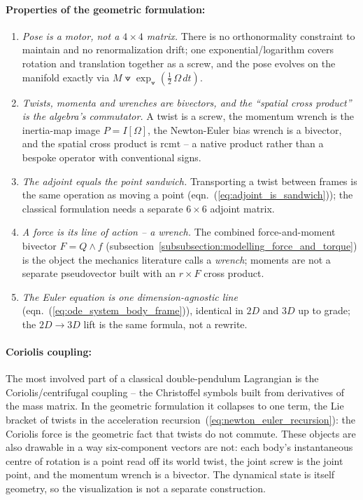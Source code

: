 \paragraph{Properties of the geometric formulation:}
\begin{enumerate}
    \item \emph{Pose is a motor, not a $4\times4$ matrix.} There is no orthonormality
          constraint to maintain and no renormalization drift; one exponential/logarithm
          covers rotation and translation together as a screw, and the pose evolves on the
          manifold exactly via $M \veedot \exp_\veedot(\tfrac12\,\Omega\,dt)$.
    \item \emph{Twists, momenta and wrenches are bivectors, and the ``spatial cross
          product'' is the algebra's commutator.} A twist is a screw, the
          momentum wrench is the inertia-map image $P = I[\Omega]$, the Newton-Euler bias
          wrench is a bivector, and the spatial cross product is $\mathrm{rcmt}$ -- a
          native product rather than a bespoke operator with conventional signs.
    \item \emph{The adjoint equals the point sandwich.} Transporting a twist between
          frames is the same operation as moving a point
          (eqn.~(\ref{eq:adjoint_is_sandwich})); the classical formulation needs a
          separate $6\times6$ adjoint matrix.
    \item \emph{A force is its line of action -- a wrench.} The combined force-and-moment
          bivector $F = Q \wedge f$
          (subsection~\ref{subsubsection:modelling_force_and_torque}) is the
          object the mechanics literature calls a \emph{wrench}; moments are not a
          separate pseudovector built with an $r \times F$ cross product.
    \item \emph{The Euler equation is one dimension-agnostic line}
          (eqn.~(\ref{eq:ode_system_body_frame})), identical in $2D$ and $3D$ up to grade;
          the $2D \to 3D$ lift is the same formula, not a rewrite.
\end{enumerate}

\paragraph{Coriolis coupling:} The most involved part of a classical double-pendulum
Lagrangian is the
Coriolis/centrifugal coupling -- the Christoffel symbols built from derivatives of the
mass matrix. In the geometric formulation it collapses to one term, the Lie bracket of
twists in the acceleration recursion~(\ref{eq:newton_euler_recursion}): the Coriolis
force is the geometric fact that twists do not commute. These objects are also drawable
in a way six-component vectors are not: each body's instantaneous centre of rotation is a
point read off its world twist, the joint screw is the joint point, and the momentum
wrench is a bivector. The dynamical state is itself geometry, so the
visualization is not a separate construction.

